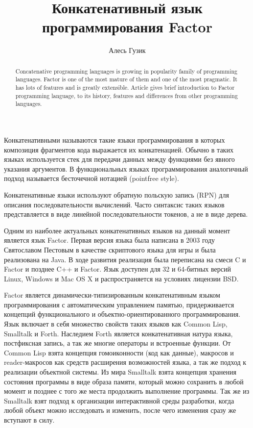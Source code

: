 \documentclass[a5paper,10pt,russian]{article}
\title{Конкатенативный язык программирования Factor}
\author{Алесь Гузик}
\begin{document}
\maketitle


\begin{abstract}
  Concatenative programming languages is growing in popularity family
  of programming languages. Factor is one of the most mature of them
  and one of the most pragmatic. It has lots of features and is
  greatly extensible. Article gives brief introduction to Factor
  programming language, to its history, features and differences from
  other programming languages.
\end{abstract}

Конкатенативными называются такие языки программирования в которых
композиция фрагментов кода выражается их конкатенацией. Обычно в
таких языках используется стек для передачи данных между функциями без
явного указания аргументов. В функциональных языках программирования
аналогичный подход называется бесточечной нотацией (pointfree style).

Конкатенативные языки используют обратную польскую запись (RPN) для
описания последовательности вычислений. Часто синтаксис таких языков
представляется в виде линейной последовательности токенов, а не в виде
дерева.

Одним из наиболее актуальных конкатенативных языков на данный момент
является язык Factor. Первая версия языка была написана в 2003 году
Святославом Пестовым в качестве скриптового языка для игры и была
реализована на Java. В ходе развития реализация была переписана на
смеси C и Factor и позднее C++ и Factor. Язык доступен для 32 и
64-битных версий Linux, Windows и Mac OS X и распространяется на
условиях лицензии BSD.

Factor является динамически-типизированным конкатенативным языком
программирования с автоматическим управлением памятью, придерживается
концепций функционального и объектно-ориентированного
программирования. Язык включает в себя множество свойств таких языков
как Common Lisp, Smalltalk и Forth. Наследием Forth является
конкатенативная натура языка, постфиксная запись, а так же многие
операторы и встроенные функции. От Common Lisp взята концепция
гомоиконности (код как данные), макросов и reader-макросов как средств
расширения возможностей языка, а так же подход к реализации объектной
системы. Из мира Smalltalk взята концепция хранения состояния
программы в виде образа памяти, который можно сохранить в любой момент
и позднее с того же места продолжить выполнение программы. Так же из
Smalltalk взят подход к организации интерактивной среды разработки,
когда любой объект можно исследовать и изменить, после чего изменения
сразу же вступают в силу.
\end{document}
